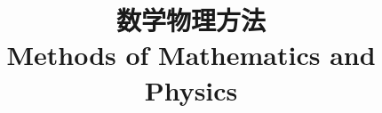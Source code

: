 \documentclass{../thunote}
\begin{document}
\title{数学物理方法\\Methods of Mathematics and Physics}
\maketitle

\frontmatter
\tableofcontents

\mainmatter





\appendix

\end{document}
